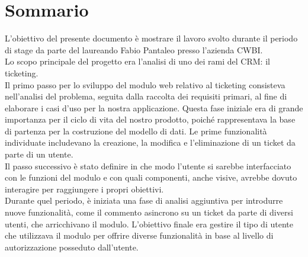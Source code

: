 \cleardoublepage
{}
{}
\begingroup
\let\clearpage\relax
\let\cleardoublepage\relax
\let\cleardoublepage\relax

\chapter*{Sommario}

L'obiettivo del presente documento è mostrare il lavoro svolto durante il periodo di stage da parte del laureando Fabio Pantaleo presso l'azienda CWBI.\\
Lo scopo principale del progetto era l'analisi di uno dei rami del CRM\glsfirstoccur \;: il ticketing\glsfirstoccur . \\
Il primo passo per lo sviluppo del modulo web relativo al ticketing consisteva nell'analisi del problema, seguita dalla raccolta dei requisiti primari, al fine di elaborare i casi d'uso per la nostra applicazione. Questa fase iniziale era di grande importanza per il ciclo di vita del nostro prodotto, poiché rappresentava la base di partenza per la costruzione del modello di dati.
Le prime funzionalità individuate includevano la creazione, la modifica e l'eliminazione di un ticket da parte di un utente.\\
Il passo successivo è stato definire in che modo l'utente si sarebbe interfacciato con le funzioni del modulo e con quali componenti, anche visive, avrebbe dovuto interagire per raggiungere i propri obiettivi.\\
Durante quel periodo, è iniziata una fase di analisi aggiuntiva per introdurre nuove funzionalità, come il commento asincrono su un ticket da parte di diversi utenti, che arricchivano il modulo.
L'obiettivo finale era gestire il tipo di utente che utilizzava il modulo per offrire diverse funzionalità in base al livello di autorizzazione posseduto dall'utente.\\





\endgroup

\vfill
